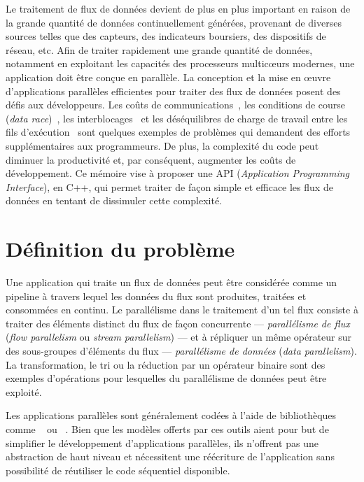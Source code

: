 \begin{introduction}

Le traitement de flux de donn\'ees devient de plus en plus important en raison de la grande quantit\'e de donn\'ees continuellement g\'en\'er\'ees, provenant de diverses sources telles que des capteurs, des indicateurs boursiers, des dispositifs de r\'eseau, etc. Afin de traiter rapidement une grande quantit\'e de donn\'ees, notamment en exploitant les capacit\'es des processeurs multicœurs modernes, une application doit \^etre con\c cue en parall\`ele. La conception et la mise en œuvre d'applications parall\`eles efficientes pour traiter des flux de donn\'ees posent des d\'efis aux d\'eveloppeurs. Les co\^uts de communications~\citep{amarasinghe2011ascr}, les conditions de course (\emph{data race})~\citep{wu2015detecting}, les interblocages~\citep{haque2006concurrent} et les d\'es\'equilibres de charge de travail entre les fils d'ex\'ecution~\citep{amarasinghe2011ascr} sont quelques exemples de probl\`emes qui demandent des efforts suppl\'ementaires aux programmeurs. De plus, la complexit\'e du code peut diminuer la productivit\'e et, par cons\'equent, augmenter les co\^uts de d\'eveloppement. Ce m\'emoire vise \`a proposer une API (\emph{Application Programming Interface}), en C++, qui permet traiter de fa\c con simple et efficace les flux de donn\'ees en tentant de dissimuler cette complexit\'e.

\section*{D\'efinition du probl\`eme}

Une application qui traite un flux de données peut \^etre consid\'er\'ee comme un pipeline \`a travers lequel les donn\'ees du flux sont produites, trait\'ees et consomm\'ees en continu. Le parall\'elisme dans le traitement d'un tel flux consiste \`a traiter des \'el\'ements distinct du flux de fa\c{c}on concurrente --- \emph{parall\'elisme de flux} (\emph{flow parallelism} ou \emph{stream parallelism}) --- et \`a r\'epliquer un m\^eme op\'erateur sur des sous-groupes d'\'el\'ements du flux --- \emph{parall\'elisme de donn\'ees} (\emph{data parallelism}). La transformation, le tri ou la r\'eduction par un op\'erateur binaire sont des exemples d'op\'erations pour lesquelles du parall\'elisme de donn\'ees peut \^etre exploit\'e. 


Les applications parall\`eles sont g\'en\'eralement cod\'ees \`a l'aide de biblioth\`eques comme ~\citep{AldinucciEtAl14} ou ~\citep{Reinders07}. Bien que les mod\`eles offerts par ces outils aient pour but de simplifier le d\'eveloppement d'applications parall\`eles, ils n'offrent pas une abstraction de haut niveau et n\'ecessitent une r\'e\'ecriture de l'application sans possibilit\'e de r\'eutiliser le code s\'equentiel disponible.


\end{introduction}
